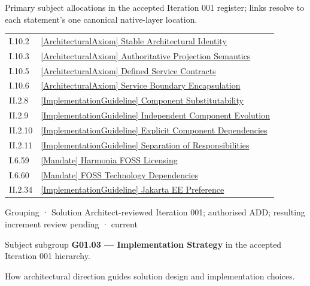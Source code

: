 Primary subject allocations in the accepted Iteration 001 register; links resolve to each statement’s one canonical native-layer location.\par
\begin{longtable}{p{.22\linewidth}p{.73\linewidth}}
I.10.2 & \hyperref[element:86ecebbf65fc46af9763c96840342823]{[ArchitecturalAxiom] Stable Architectural Identity} \\
I.10.3 & \hyperref[element:d8ae43c850a646d485e6aba6c41a88e2]{[ArchitecturalAxiom] Authoritative Projection Semantics} \\
I.10.5 & \hyperref[element:b7d07bb4ec064272898d2f0189cffefd]{[ArchitecturalAxiom] Defined Service Contracts} \\
I.10.6 & \hyperref[element:376363587388401194ff967b0fe80a5a]{[ArchitecturalAxiom] Service Boundary Encapsulation} \\
II.2.8 & \hyperref[element:d4864b46c56e455189e418f3eaffec5c]{[ImplementationGuideline] Component Substitutability} \\
II.2.9 & \hyperref[element:c532bca066db4c419ccff5c52899af2a]{[ImplementationGuideline] Independent Component Evolution} \\
II.2.10 & \hyperref[element:2c21d1a175fb4c1486f6a91830838cde]{[ImplementationGuideline] Explicit Component Dependencies} \\
II.2.11 & \hyperref[element:8983e2a7c2814c9c99aa1f81eaabe9bd]{[ImplementationGuideline] Separation of Responsibilities} \\
I.6.59 & \hyperref[element:40880a1432ab4848ab5278839620a406]{[Mandate] Harmonia FOSS Licensing} \\
I.6.60 & \hyperref[element:13c56fcda53c406494561c883f32fc1c]{[Mandate] FOSS Technology Dependencies} \\
II.2.34 & \hyperref[element:17ae70b671b5451a812df11d59ff6e1c]{[ImplementationGuideline] Jakarta EE Preference} \\
\end{longtable}
\label{element:8bf2a60efafc4caf89ed9744adfb628d}
{\small Grouping · Solution Architect-reviewed Iteration 001; authorised ADD; resulting increment review pending · current}\par

Subject subgroup \textbf{G01.03 — Implementation Strategy} in the accepted Iteration 001 hierarchy.



How architectural direction guides solution design and implementation choices.



